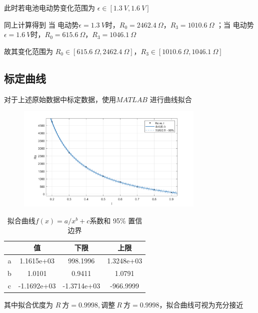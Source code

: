 \documentclass[UTF8]{ctexart}
\begin{document}
此时若电池电动势变化范围为 $\epsilon \in [1.3\ V ,1.6\ V]$

同上计算得到 当 电动势$\epsilon = 1.3 \ V$时，$R_0 = 2462.4 \ \Omega$，$R_3 = 1010.6 \ \Omega$
；当 电动势$\epsilon = 1.6 \ V$时，$R_0 = 615.6 \ \Omega$，$R_3 = 1046.1 \ \Omega$

故其变化范围为 $R_0 \in [615.6 \ \Omega, 2462.4 \ \Omega]$，$R_3 \in [ 1010.6 \ \Omega, 1046.1 \ \Omega]$


\newpage

\subsection{标定曲线}
对于上述原始数据中标定数据，使用$MATLAB$ 进行曲线拟合
\begin{figure}[H]  %
		\centering
		\includegraphics[width=0.8\textwidth,height=0.5\textwidth]{img/万用表拟合图像.png}
		\label{fig:side:b} 
\end{figure}
\begin{table}[H]
    \centering
    \caption*{拟合曲线$f(x) = a/x^b+c$系数和 95\% 置信边界}
    \begin{tabular}{|c|c|c|c|}
    \toprule
             &    值    &        下限       &    上限     \\
    \midrule      
a   &  1.1615e+03  &   998.1996   &    1.3248e+03       \\
    \midrule
b   &  1.0101      &   0.9411     &    1.0791           \\
    \midrule
c   & -1.1692e+03  &  -1.3714e+03 &  -966.9999  \\
    \bottomrule
    \end{tabular}
\end{table}
其中拟合优度为 $R\  \text{方} =       0.9998 ,        \text{调整} \ R \  \text{方}    = 0.9998$，拟合曲线可视为充分接近      
\end{document}
